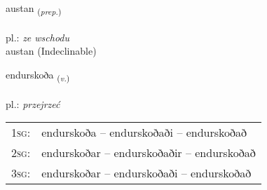 \documentclass[frontgrid, backgrid]{flacards}\usepackage[]{graphicx}\usepackage[]{xcolor}
\begin{document}

\renewcommand{\flhead}{\vskip5pt \fboxsep=0pt {\small\bfseries\footnotesize Forsetning | Preposition}}
\renewcommand{\fcfoot}{\vskip5pt \fboxsep=0pt \hspace{2pt}{\small\bfseries\footnotesize 2K}}

\renewcommand{\blhead}{\vskip5pt {\small\bfseries\footnotesize Forsetning | Preposition }}
\renewcommand{\bcfoot}{\vskip5pt \hspace{2pt}{\small\bfseries\footnotesize 2K}}


{austan \small{\textsubscript{(\textit{prep.})}} \\[1ex]
\textphonetic{[œistan]} \\
pl.: \emph{ze wschodu} \\  [2ex]
austan (Indeclinable)}

\renewcommand{\flhead}{\vskip5pt \fboxsep=0pt {\small\bfseries\footnotesize Sagnorð | Verb}}
\renewcommand{\fcfoot}{\vskip5pt \fboxsep=0pt \hspace{2pt}{\small\bfseries\footnotesize 2K}}

\renewcommand{\blhead}{\vskip5pt {\small\bfseries\footnotesize Sagnorð | Verb }}
\renewcommand{\bcfoot}{\vskip5pt \hspace{2pt}{\small\bfseries\footnotesize 2K}}


{endurskoða \small{\textsubscript{(\textit{v.})}} \\[1ex] %
 \\
pl.: \emph{przejrzeć} \\  [2ex]
\renewcommand*{\arraystretch}{0.8}
\begin{tabular}{p{1cm}l}
\textsc{1sg}: & endurskoða -- endurskoðaði -- endurskoðað \\ 
\textsc{2sg}: & endurskoðar -- endurskoðaðir -- endurskoðað \\ 
\textsc{3sg}: & endurskoðar -- endurskoðaði -- endurskoðað \\ 
\end{tabular}
}
\end{document}
